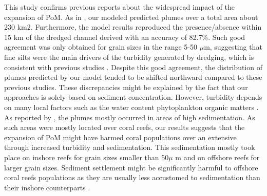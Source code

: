 \documentclass[preprint,12pt,authoryear]{elsarticle}
\begin{document}
This study confirms previous reports about the widespread impact of the expansion of PoM. As in \cite{barnes2015sediment}, our modeled predicted plumes over a total area about 230 km$2$. Furthermore, the model results reproduced the presence/absence within 15 km of the dredged channel derived \cite{cunning2019extensive} with an accuracy of 82.7\%. Such good agreement was only obtained for grain sizes in the range 5-50 $\mu$m, suggesting that fine silts were the main drivers of the turbidity generated by dredging, which is consistent with previous studies \citep{fourney2017additive}. Despite this good agreement, the distribution of plumes predicted by our model tended to be shifted northward compared to these previous studies. These discrepancies might be explained by the fact that our approaches is solely based on sediment concentration. However, turbidity depends on many local factors such as the water content phytoplankton organic matters \citep{gray2000comparability,thackston2000improved}. As reported by \cite{cunning2019extensive}, the plumes mostly occurred in areas of high sedimentation. As such areas were mostly located over coral reefs, our results suggests that the expansion of PoM might have harmed coral populations over an extensive through increased turbidity and sedimentation. This sedimentation mostly took place on inshore reefs for grain sizes smaller than 50$\mu$ m and on offshore reefs for larger grain sizes. Sediment settlement might be significantly harmful to offshore coral reefs populations as they are usually less accustomed to sedimentation than their inshore  counterparts \citep{wolanski2005fine}.
\end{document}
